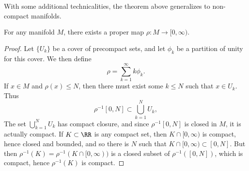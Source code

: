 With some additional technicalities, the theorem above generalizes to non-compact manifolds.

\begin{lemma}
    For any manifold $M$, there exists a proper map $\rho: M \to [0,\infty)$.
\end{lemma}
\begin{proof}
    Let $\{ U_k \}$ be a cover of precompact sets, and let $\phi_k$ be a partition of unity for this cover. We then define
    \[ \rho = \sum_{k = 1}^\infty k \phi_k. \]
    If $x \in M$ and $\rho(x) \leq N$, then there must exist some $k \leq N$ such that $x \in U_k$. Thus
    \[ \rho^{-1}[0,N] \subset \bigcup_{k = 1}^N U_k, \]
    The set $\bigcup_{k = 1}^N U_k$ has compact closure, and since $\rho^{-1}[0,N]$ is closed in $M$, it is actually compact. If $K \subset \RR$ is any compact set, then $K \cap [0,\infty)$ is compact, hence closed and bounded, and so there is $N$ such that $K \cap [0,\infty) \subset [0,N]$. But then $\rho^{-1}(K) = \rho^{-1}(K \cap [0,\infty))$ is a closed subset of $\rho^{-1}([0,N])$, which is compact, hence $\rho^{-1}(K)$ is compact.
\end{proof}


